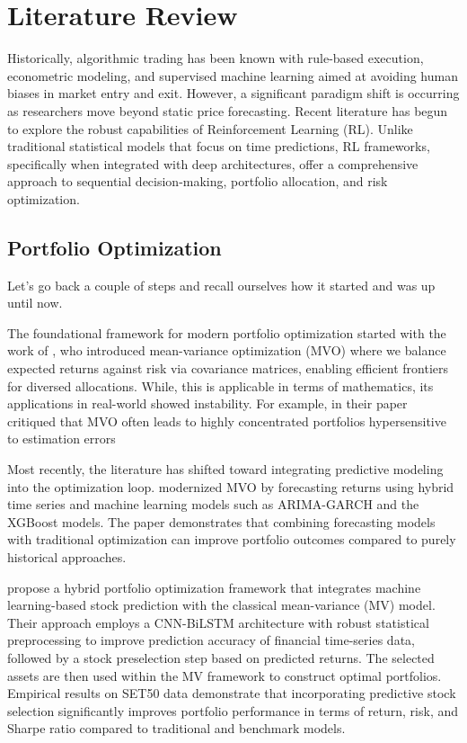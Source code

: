 \documentclass[]{elsarticle}
\begin{document}
\hypertarget{literature-review}{%
\section{Literature Review}\label{literature-review}}

Historically, algorithmic trading has been known with rule-based execution, econometric modeling, and supervised machine learning aimed at avoiding human biases in market entry and exit. However, a significant paradigm shift is occurring as researchers move beyond static price forecasting. Recent literature has begun to explore the robust capabilities of Reinforcement Learning (RL). Unlike traditional statistical models that focus on time predictions, RL frameworks, specifically when integrated with deep architectures, offer a comprehensive approach to sequential decision-making, portfolio allocation, and risk optimization.

\hypertarget{algorithmic-trading-and-portfolio-optimization}{%
\subsection{Portfolio Optimization}\label{algorithmic-trading-and-portfolio-optimization}}

Let's go back a couple of steps and recall ourselves how it started and was up until now.

The foundational framework for modern portfolio optimization started with the work of \citet{Markowitz_1952}, who introduced mean-variance optimization (MVO) where we balance expected returns against risk via covariance matrices, enabling efficient frontiers for diversed allocations. While, this is applicable in terms of mathematics, its applications in real-world showed instability. For example, \citet{Black_Literman} in their paper critiqued that MVO often leads to highly concentrated portfolios hypersensitive to estimation errors

Most recently, the literature has shifted toward integrating predictive modeling into the optimization loop. \citet{slusarczyk2025optimal} modernized MVO by forecasting returns using hybrid time series and machine learning models such as ARIMA-GARCH and the XGBoost models. The paper demonstrates that combining forecasting models with traditional optimization can improve portfolio outcomes compared to purely historical approaches.

\citet{chaweewanchon2022markowitz}  propose a hybrid portfolio optimization framework that integrates machine learning-based stock prediction with the classical mean-variance (MV) model. Their approach employs a CNN-BiLSTM architecture with robust statistical preprocessing to improve prediction accuracy of financial time-series data, followed by a stock preselection step based on predicted returns. The selected assets are then used within the MV framework to construct optimal portfolios. Empirical results on SET50 data demonstrate that incorporating predictive stock selection significantly improves portfolio performance in terms of return, risk, and Sharpe ratio compared to traditional and benchmark models.
\end{document}
